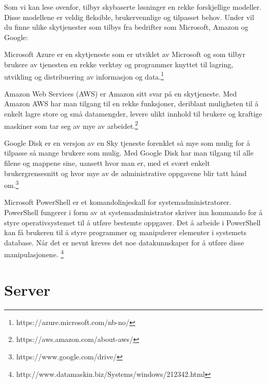 Som vi kan lese ovenfor, tilbyr skybaserte løsninger en rekke forskjellige modeller. Disse modellene er veldig fleksible, brukervennlige og tilpasset behov. Under vil du finne ulike skytjenester som tilbys fra bedrifter som Microsoft, Amazon og Google:
\begin{description}
\item Microsoft Azure er en skytjeneste som er utviklet av Microsoft og som tilbyr brukere av tjenesten en rekke verktøy og programmer knyttet til lagring, utvikling og distribuering av informasjon og data.\footnote{https://azure.microsoft.com/nb-no/}

\item Amazon Web Services (AWS) er Amazon sitt svar på en skytjeneste. Med Amazon AWS har man tilgang til en rekke funksjoner, deriblant muligheten til å enkelt lagre store og små datamengder, levere ulikt innhold til brukere og kraftige maskiner som tar seg av mye av arbeidet.\footnote{https://aws.amazon.com/about-aws/}

\item Google Disk er en versjon av en Sky tjeneste forenklet så mye som mulig for å tilpasse så mange brukere som mulig. Med Google Disk har man tilgang til alle filene og mappene sine, uansett hvor man er, med et svært enkelt brukergrensesnitt og hvor mye av de administrative oppgavene blir tatt hånd om.\footnote{https://www.google.com/drive/}

\item Microsoft PowerShell er et komandolinjeskall for systemadministratorer. PowerShell fungerer i form av at systemadministrator skriver inn kommando for å styre operativsystemet til å utføre bestemte oppgaver. Det å arbeide i PowerShell kan få brukeren til å styre programmer og manipulerer elementer i systemets database. Når det er nevnt kreves det noe datakunnskaper for å utføre disse manipulasjonene. \footnote{http://www.datamaskin.biz/Systems/windows/212342.html}
\end{description}

\section{Server}
